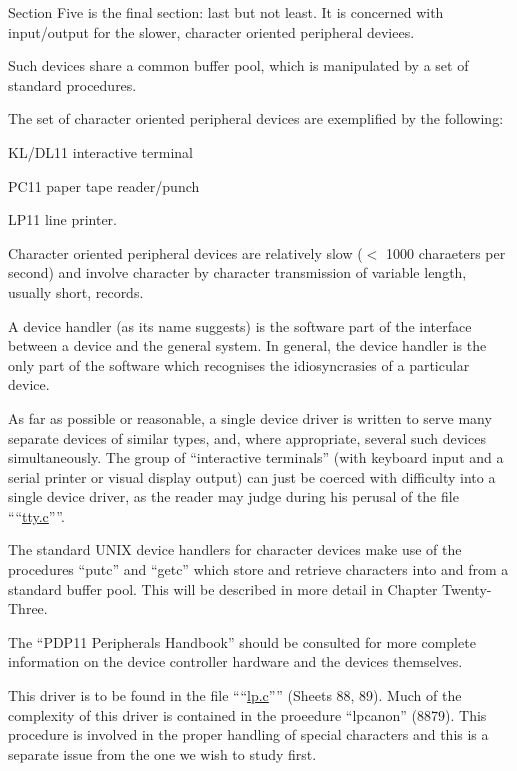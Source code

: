 %
%
{\sf Section Five is the final section: last
but not least. It is concerned with
input/output for the slower, character
oriented peripheral deviees.

Such devices share a common buffer
pool, which is manipulated by a set of
standard procedures.

The set of character oriented peripheral devices are exemplified by the
following:

\bi
\item KL/DL11 interactive terminal
\item PC11 paper tape reader/punch
\item LP11 line printer.
\ei
}


Character oriented peripheral devices
are relatively slow ($<$ 1000 charaeters
per second) and involve character by
character transmission of variable
length, usually short, records.

A device handler (as its name suggests)
is the software part of the interface
between a device and the general system. In general, the device handler is
the only part of the software which
recognises the idiosyncrasies of a particular device.

As far as possible or reasonable, a
single device driver is written to
serve many separate devices of similar
types, and, where appropriate, several
such devices simultaneously. The group
of ``interactive terminals'' (with keyboard input and a serial printer or
visual display output) can just be
coerced with difficulty into a single
device driver, as the reader may judge
during his perusal of the file ````\href{./v6/dmr/tty.c}{tty.c}''''.

The standard UNIX device handlers for
character devices make use of the procedures ``putc'' and ``getc'' which store
and retrieve characters into and from a
standard buffer pool. This will be
described in more detail in Chapter
Twenty-Three.

The ``PDP11 Peripherals Handbook'' should
be consulted for more complete information on the device controller hardware
and the devices themselves.


This driver is to be found in the file
````\href{./v6/dmr/lp.c}{lp.c}'''' (Sheets 88, 89). Much of the
complexity of this driver is contained
in the proeedure ``lpcanon'' (8879).
This procedure is involved in the
proper handling of special characters
and this is a separate issue from the
one we wish to study first.


